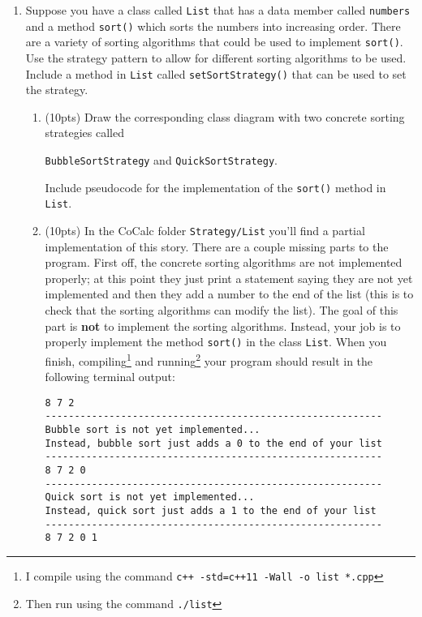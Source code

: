 \documentclass[11pt]{article}
\newlength{\up}\setlength{\up}{-\baselineskip}
\begin{document}
\begin{enumerate}
\begin{enumerate}
  \end{enumerate}

\newpage

  \item Suppose you have a class called \texttt{List} that has a data member called \texttt{numbers} and a method \texttt{sort()} which sorts the numbers into increasing order. There are a variety of sorting algorithms that could be used to implement \texttt{sort()}. Use the strategy pattern to allow for different sorting algorithms to be used. Include a method in \texttt{List} called \texttt{setSortStrategy()} that can be used to set the strategy. 

  \begin{enumerate}

    \item (10pts) Draw the corresponding class diagram with two concrete sorting strategies called 

    \texttt{BubbleSortStrategy} and \texttt{QuickSortStrategy}. 
    
     Include pseudocode for the implementation of the \texttt{sort()} method in \texttt{List}. 

  \vfill

  \item (10pts) In the CoCalc folder \texttt{Strategy/List} you'll find a partial implementation of this story. There are a couple missing parts to the program. First off, the concrete sorting algorithms are not implemented properly; at this point they just print a statement saying they are not yet implemented and then they add a number to the end of the list (this is to check that the sorting algorithms can modify the list). The goal of this part is {\bf not} to implement the sorting algorithms. Instead, your job is to properly implement the method \texttt{sort()} in the class \texttt{List}. When you finish, compiling\footnote{I compile using the command \texttt{c++ -std=c++11 -Wall -o list *.cpp}} and running\footnote{Then run using the command \texttt{./list}} your program should result in the following terminal output:
\begin{verbatim}
8 7 2 
----------------------------------------------------------
Bubble sort is not yet implemented...                     
Instead, bubble sort just adds a 0 to the end of your list
----------------------------------------------------------
8 7 2 0 
----------------------------------------------------------
Quick sort is not yet implemented...                      
Instead, quick sort just adds a 1 to the end of your list 
----------------------------------------------------------
8 7 2 0 1 
\end{verbatim}


\end{enumerate}
\end{enumerate}
\end{document}

